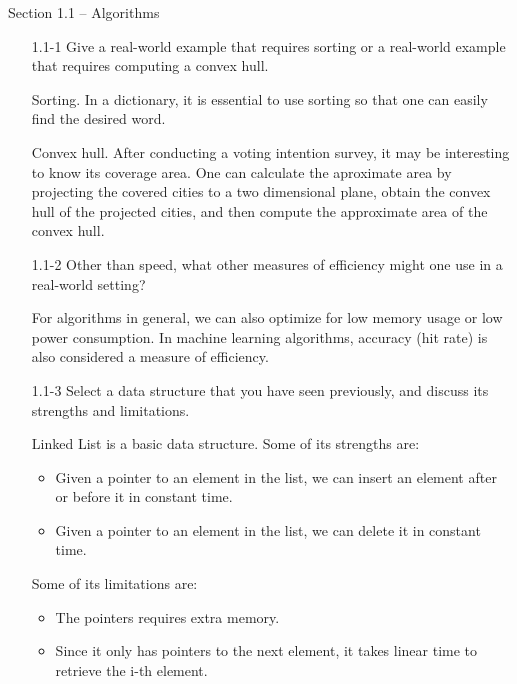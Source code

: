
{\large Section 1.1 {--} Algorithms}

\begin{enumerate}

\item[1.1{-}1] Give a real-world example that requires sorting or
  a real-world example that requires computing a convex hull.

\begin{framed}
Sorting. In a dictionary, it is essential to use sorting so that one
can easily find the desired word.

Convex hull. After conducting a voting intention survey, it may be
interesting to know its coverage area. One can calculate the aproximate area by
projecting the covered cities to a two dimensional plane, obtain the convex hull
of the projected cities, and then compute the approximate area of the convex
hull.
\end{framed}

\item[1.1{-}2] Other than speed, what other measures of efficiency might
  one use in a real-world setting?

\begin{framed}
For algorithms in general, we can also optimize for low memory usage or low
power consumption. In machine learning algorithms, accuracy (hit rate) is also
considered a measure of efficiency.
\end{framed}

\item[1.1{-}3] Select a data structure that you have seen previously,
  and discuss its strengths and limitations.

\begin{framed}
Linked List is a basic data structure. Some of its strengths are:

\begin{itemize}
\item Given a pointer to an element in the list, we can insert an element after
  or before it in constant time.
\item Given a pointer to an element in the list, we can delete it in constant
  time.
\end{itemize}

Some of its limitations are:

\begin{itemize}
\item The pointers requires extra memory.
\item Since it only has pointers to the next element, it takes linear time to
  retrieve the i-th element.
\end{itemize}
\end{framed}


\end{enumerate}
